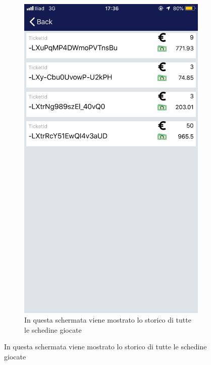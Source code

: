 \documentclass[numbers=noenddot, 12pt, a4paper, oneside]{scrbook}
\begin{document}
\begin{figure}[H]
	\centering
	\begin{subfigure}{.5\textwidth}
		\centering
		\includegraphics[width=.8\linewidth]{images/Screen/Storico}
		\caption{In questa schermata viene mostrato lo storico di tutte le schedine giocate}
	\end{subfigure}
\end{figure}
\end{document}
